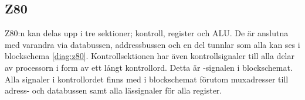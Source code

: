 \documentclass[main.tex]{subfiles}
\begin{document}
\subsection{Z80}
Z80:n kan delas upp i tre sektioner; kontroll, register och ALU. De är anslutna
med varandra via databussen, addressbussen och en del tunnlar som alla kan ses
i blockschema \ref{diag:z80}. Kontrollsektionen har även kontrollsignaler till
alla delar av processorn i form av ett långt kontrollord. Detta är
-signalen i blockschemat. Alla signaler i kontrollordet finns med i
blockschemat förutom muxadresser till adress- och databussen samt alla
lässignaler för alla register.





\newpage
\end{document}
